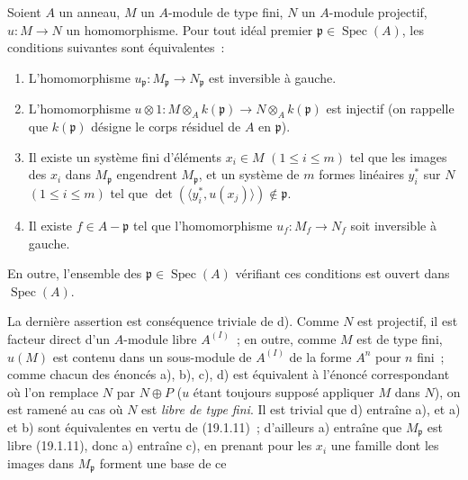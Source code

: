 \begin{corollary}[19.1.12]
\label{0.19.1.12-fr}
Soient $A$ un anneau, $M$ un $A$-module de type fini, $N$ un $A$-module
projectif, $u:M\to N$ un homomorphisme. Pour tout idéal premier
$\mathfrak p\in\operatorname{Spec}(A)$, les conditions suivantes sont
équivalentes~:
\begin{enumerate}
  \item[a)] L'homomorphisme
  $u_{\mathfrak p}:M_{\mathfrak p}\to N_{\mathfrak p}$ est inversible à
  gauche.
  \item[b)] L'homomorphisme
  $u\otimes1:M\otimes_Ak(\mathfrak p)\to N\otimes_Ak(\mathfrak p)$ est
  injectif (on rappelle que $k(\mathfrak p)$ désigne le corps résiduel de $A$
  en $\mathfrak p$).
  \item[c)] Il existe un système fini d'éléments $x_i\in M$
  $(1\leq i\leq m)$ tel que les images des $x_i$ dans $M_{\mathfrak p}$
  engendrent $M_{\mathfrak p}$, et un système de $m$ formes linéaires
  $y_i^*$ sur $N$ $(1\leq i\leq m)$ tel que
  $\det(\langle y_i^*,u(x_j)\rangle)\notin\mathfrak p$.
  \item[d)] Il existe $f\in A-\mathfrak p$ tel que l'homomorphisme
  $u_f:M_f\to N_f$ soit inversible à gauche.
\end{enumerate}
En outre, l'ensemble des $\mathfrak p\in\operatorname{Spec}(A)$ vérifiant ces
conditions est ouvert dans $\operatorname{Spec}(A)$.
\end{corollary}

La dernière assertion est conséquence triviale de d). Comme $N$ est
projectif, il est facteur direct d'un $A$-module libre $A^{(I)}$~; en outre,
comme $M$ est de type fini, $u(M)$ est contenu dans un sous-module de $A^{(I)}$
de la forme $A^n$ pour $n$ fini~; comme chacun des énoncés a), b), c), d) est
équivalent à l'énoncé correspondant où l'on remplace $N$ par $N\oplus P$ ($u$
étant toujours supposé appliquer $M$ dans $N$), on est ramené au cas où $N$
est \emph{libre de type fini}. Il est trivial que d) entraîne a), et a) et b)
sont équivalentes en vertu de (19.1.11)~; d'ailleurs a) entraîne que
$M_{\mathfrak p}$ est libre (19.1.11), donc a) entraîne c), en prenant pour les
$x_i$ une famille dont les images dans $M_{\mathfrak p}$ forment une base de ce


